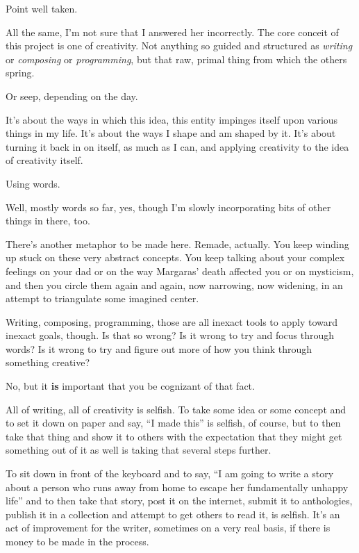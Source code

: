 \begin{ally}
Point well taken.
\end{ally}
All the same, I'm not sure that I answered her incorrectly. The core conceit of this project is one of creativity. Not anything so guided and structured as \emph{writing} or \emph{composing} or \emph{programming}, but that raw, primal thing from which the others spring.

\begin{ally}
Or seep, depending on the day.
\end{ally}
It's about the ways in which this idea, this entity impinges itself upon various things in my life. It's about the ways I shape and am shaped by it. It's about turning it back in on itself, as much as I can, and applying creativity to the idea of creativity itself.

\begin{ally}
Using words.
\end{ally}
Well, mostly words so far, yes, though I'm slowly incorporating bits of other things in there, too.

\begin{ally}
There's another metaphor to be made here. Remade, actually. You keep winding up stuck on these very abstract concepts. You keep talking about your complex feelings on your dad or on the way Margaras' death affected you or on mysticism, and then you circle them again and again, now narrowing, now widening, in an attempt to triangulate some imagined center.
\end{ally}
Writing, composing, programming, those are all inexact tools to apply toward inexact goals, though. Is that so wrong? Is it wrong to try and focus through words? Is it wrong to try and figure out more of how you think through something creative?

\begin{ally}
No, but it \textbf{is} important that you be cognizant of that fact.
\end{ally}\newpage

All of writing, all of creativity is selfish. To take some idea or some concept and to set it down on paper and say, ``I made this'' is selfish, of course, but to then take that thing and show it to others with the expectation that they might get something out of it as well is taking that several steps further.

To sit down in front of the keyboard and to say, ``I am going to write a story about a person who runs away from home to escape her fundamentally unhappy life'' and to then take that story, post it on the internet, submit it to anthologies, publish it in a collection and attempt to get others to read it, is selfish. It's an act of improvement for the writer, sometimes on a very real basis, if there is money to be made in the process.

